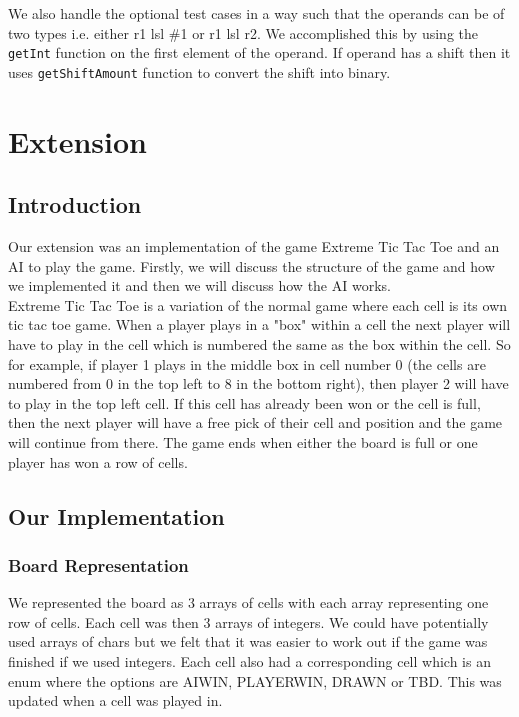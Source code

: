 \documentclass[10pt]{article}
\begin{document}
We also handle the optional test cases in a way such that the operands can be of two types i.e. either r1 lsl \#1 or r1 lsl r2. We accomplished this by using the {\tt{getInt}} function on the first element of the operand. If operand has a shift then it uses {\tt{getShiftAmount}} function to convert the shift into binary.

\section{Extension}
\subsection{Introduction}
Our extension was an implementation of the game Extreme Tic Tac Toe and an AI to play the game. Firstly, we will discuss the structure of the game and how we implemented it and then we will discuss how the AI works.
\\Extreme Tic Tac Toe is a variation of the normal game where each cell is its own tic tac toe game. When a player plays in a "box" within a cell the next player will have to play in the cell which is numbered the same as the box within the cell. So for example, if player 1 plays in the middle box in cell number 0 (the cells are numbered from 0 in the top left to 8 in the bottom right), then player 2 will have to play in the top left cell. If this cell has already been won or the cell is full, then the next player will have a free pick of their cell and position and the game will continue from there. The game ends when either the board is full or one player has won a row of cells.
\subsection{Our Implementation}
\subsubsection{Board Representation}
We represented the board as 3 arrays of cells with each array representing one row of cells. Each cell was then 3 arrays of integers. We could have potentially used arrays of chars but we felt that it was easier to work out if the game was finished if we used integers. Each cell also had a corresponding cell which is an enum where the options are AIWIN, PLAYERWIN, DRAWN or TBD. This was updated when a cell was played in.
\end{document}
